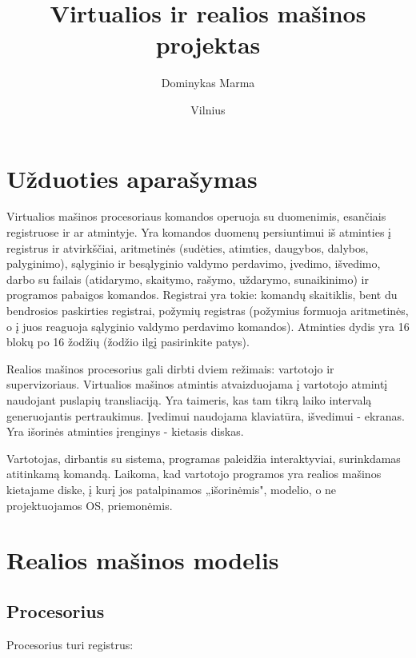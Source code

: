 \documentclass{VUMIFInfKursinis}
\institute{Informatikos institutas}  %
\title{Virtualios ir realios mašinos projektas}
\author{Dominykas Marma}
\date{Vilnius \\ \the\year}
\begin{document}
\maketitle

\tableofcontents

\section{Užduoties aparašymas}

Virtualios mašinos procesoriaus komandos operuoja su duomenimis, esančiais registruose ir ar atmintyje. Yra komandos duomenų persiuntimui iš atminties į registrus ir atvirkščiai, aritmetinės (sudėties, atimties, daugybos, dalybos, palyginimo), sąlyginio ir besąlyginio valdymo perdavimo, įvedimo, išvedimo, darbo su failais (atidarymo, skaitymo, rašymo, uždarymo, sunaikinimo) ir programos pabaigos komandos. Registrai yra tokie: komandų skaitiklis, bent du bendrosios paskirties registrai, požymių registras (požymius formuoja aritmetinės, o į juos reaguoja sąlyginio valdymo perdavimo komandos). Atminties dydis yra 16 blokų po 16 žodžių (žodžio ilgį pasirinkite patys).


Realios mašinos procesorius gali dirbti dviem režimais: vartotojo ir supervizoriaus. Virtualios mašinos atmintis atvaizduojama į vartotojo atmintį naudojant puslapių transliaciją. Yra taimeris, kas tam tikrą laiko intervalą generuojantis pertraukimus. Įvedimui naudojama klaviatūra, išvedimui - ekranas. Yra išorinės atminties įrenginys - kietasis diskas.

Vartotojas, dirbantis su sistema, programas paleidžia interaktyviai, surinkdamas atitinkamą komandą. Laikoma, kad vartotojo programos yra realios mašinos kietajame diske, į kurį jos patalpinamos „išorinėmis", modelio, o ne projektuojamos OS, priemonėmis.

\section{Realios mašinos modelis}

\subsection{Procesorius}

Procesorius turi registrus:
\end{document}

